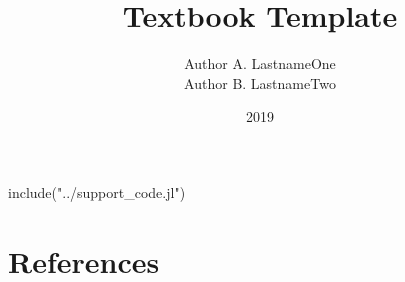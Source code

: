 \documentclass[fullbook]{tufte_algorithms_book}
\title{Textbook Template}
\author[LastnameOne and LastnameTwo]{Author A. LastnameOne \\ Author B. LastnameTwo}
\date{2019}
\begin{document}
\frontmatter



\tableofcontents


\mainmatter
\begin{jlcode}
	include("../support_code.jl")
\end{jlcode}

\appendix


\solutions
\backmatter
\chapter*{References}
\printbibliography[heading=none]

\printindex
\end{document}
